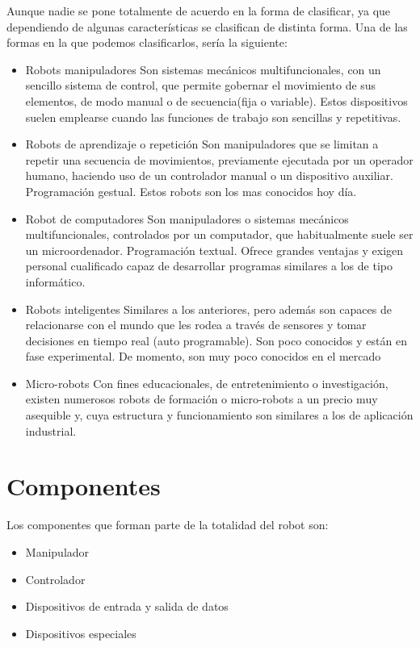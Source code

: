 \documentclass[12pt,a4paper]{report}
\begin{document}
Aunque nadie se pone totalmente de acuerdo en la forma de clasificar, ya que
dependiendo de algunas características se clasifican de distinta forma. Una de
las formas en la que podemos clasificarlos, sería la siguiente: 
\begin{itemize}
    \item Robots manipuladores
    Son sistemas mecánicos multifuncionales, con un sencillo sistema de control,
    que permite gobernar el movimiento de sus elementos, de modo manual o de
    secuencia(fija o variable).  Estos dispositivos suelen emplearse cuando las
    funciones de trabajo son sencillas y repetitivas.
    \item Robots de aprendizaje o repetición
    Son manipuladores que se limitan a repetir una secuencia de movimientos,
    previamente ejecutada por un operador humano, haciendo uso de un
    controlador manual o un dispositivo auxiliar. Programación gestual. 
    Estos robots son los mas conocidos hoy día.
    \item Robot de computadores
    Son manipuladores o sistemas mecánicos multifuncionales, controlados por un
    computador, que habitualmente suele ser un microordenador. Programación textual. 
    Ofrece grandes ventajas y exigen personal cualificado capaz de desarrollar
    programas similares a los de tipo informático.
    \item Robots inteligentes
    Similares a los anteriores, pero además son capaces de relacionarse con el mundo
    que les rodea a través de sensores y tomar decisiones en tiempo real (auto
    programable).
    Son poco conocidos y están en fase experimental. 
    De momento, son muy poco conocidos en el mercado
    \item Micro-robots
    Con fines educacionales, de entretenimiento o investigación, existen numerosos
    robots de formación o micro-robots a un precio muy asequible y, cuya estructura
    y funcionamiento son similares a los de aplicación industrial.
\end{itemize}


\section{Componentes}

Los componentes que forman parte de la totalidad del robot son:

\begin{itemize}
    \item Manipulador
    \item Controlador
    \item Dispositivos de entrada y salida de datos
    \item Dispositivos especiales
\end{itemize}
\end{document}
